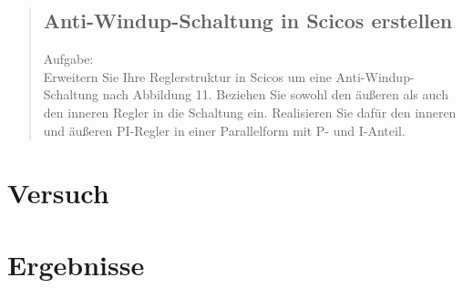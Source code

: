\begin{quote}
\begin{quote}
	\end{quote}
	
	\subsection{Anti-Windup-Schaltung in Scicos erstellen}
	Aufgabe:\\
    Erweitern Sie Ihre Reglerstruktur in Scicos um eine Anti-Windup-Schaltung nach Abbildung 11. Beziehen Sie sowohl
    den äußeren als auch den inneren Regler in die Schaltung ein. Realisieren Sie dafür den inneren und äußeren
    PI-Regler in einer Parallelform mit P- und I-Anteil.
	\begin{quote}
		
		
	\end{quote}
	
\end{quote}


\section{Versuch}
\begin{quote}
    
\end{quote}


\section{Ergebnisse}
\begin{quote}
    
\end{quote}




%     
%         

